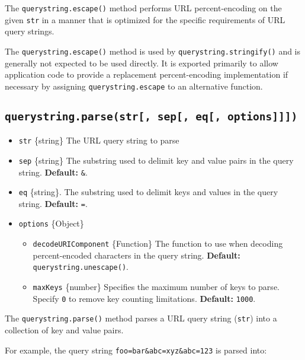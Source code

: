 The \texttt{querystring.escape()} method performs URL percent-encoding
on the given \texttt{str} in a manner that is optimized for the specific
requirements of URL query strings.

The \texttt{querystring.escape()} method is used by
\texttt{querystring.stringify()} and is generally not expected to be
used directly. It is exported primarily to allow application code to
provide a replacement percent-encoding implementation if necessary by
assigning \texttt{querystring.escape} to an alternative function.

\subsection{\texorpdfstring{\texttt{querystring.parse(str{[},\ sep{[},\ eq{[},\ options{]}{]}{]})}}{querystring.parse(str{[}, sep{[}, eq{[}, options{]}{]}{]})}}\label{querystring.parsestr-sep-eq-options}

\begin{itemize}
\tightlist
\item
  \texttt{str} \{string\} The URL query string to parse
\item
  \texttt{sep} \{string\} The substring used to delimit key and value
  pairs in the query string. \textbf{Default:}
  \texttt{\textquotesingle{}\&\textquotesingle{}}.
\item
  \texttt{eq} \{string\}. The substring used to delimit keys and values
  in the query string. \textbf{Default:}
  \texttt{\textquotesingle{}=\textquotesingle{}}.
\item
  \texttt{options} \{Object\}

  \begin{itemize}
  \tightlist
  \item
    \texttt{decodeURIComponent} \{Function\} The function to use when
    decoding percent-encoded characters in the query string.
    \textbf{Default:} \texttt{querystring.unescape()}.
  \item
    \texttt{maxKeys} \{number\} Specifies the maximum number of keys to
    parse. Specify \texttt{0} to remove key counting limitations.
    \textbf{Default:} \texttt{1000}.
  \end{itemize}
\end{itemize}

The \texttt{querystring.parse()} method parses a URL query string
(\texttt{str}) into a collection of key and value pairs.

For example, the query string
\texttt{\textquotesingle{}foo=bar\&abc=xyz\&abc=123\textquotesingle{}}
is parsed into:

